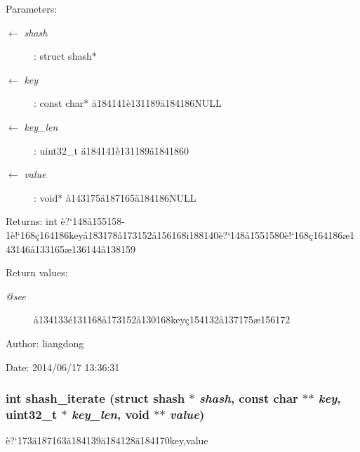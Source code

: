 \begin{Desc}
\item[Parameters:]
\begin{description}
\item[\mbox{$\leftarrow$} {\em shash}]: struct shash$\ast$ \item[\mbox{$\leftarrow$} {\em key}]: const char$\ast$ \"{a}184141\`{e}131189\"{a}184186NULL \item[\mbox{$\leftarrow$} {\em key\_\-len}]: uint32\_\-t \"{a}184141\`{e}131189\"{a}1841860 \item[\mbox{$\leftarrow$} {\em value}]: void$\ast$ \aa{}143175\"{a}187165\"{a}184186NULL \end{description}
\end{Desc}
\begin{Desc}
\item[Returns:]int \`{e}?`148\aa{}155158-1\`{e}!`168\c{c}164186key\aa{}183178\aa{}173152\aa{}156168\"{\i}188140\`{e}?`148\aa{}1551580\`{e}!`168\c{c}164186\ae{}143146\aa{}133165\ae{}136144\aa{}138159 \end{Desc}
\begin{Desc}
\item[Return values:]
\begin{description}
\item[{\em @see}]\aa{}134133\'{e}131168\aa{}173152\aa{}130168key\c{c}154132\aa{}137175\ae{}156172 \end{description}
\end{Desc}
\begin{Desc}
\item[Author:]liangdong \end{Desc}
\begin{Desc}
\item[Date:]2014/06/17 13:36:31 \end{Desc}
\subsubsection{\setlength{\rightskip}{0pt plus 5cm}int shash\_\-iterate (struct shash $\ast$ {\em shash}, const char $\ast$$\ast$ {\em key}, uint32\_\-t $\ast$ {\em key\_\-len}, void $\ast$$\ast$ {\em value})}\label{shash_8h_a8}


\`{e}?`173\"{a}187163\"{a}184139\"{a}184128\"{a}184170key,value 

